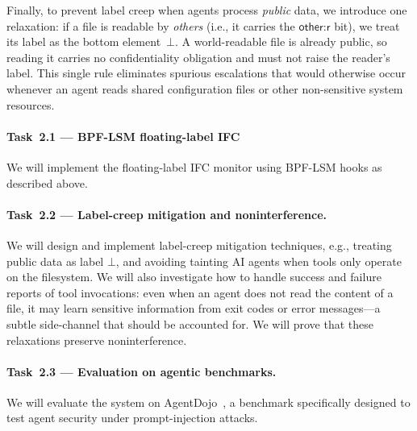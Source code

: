 \documentclass{kaw}
\begin{document}
Finally, to prevent label creep when agents process \emph{public} data, we
introduce one relaxation: if a file is readable by \emph{others} (i.e., it
carries the $\mathsf{other}\text{:}\mathsf{r}$ bit), we treat its label as the
bottom element~$\bot$.
A world-readable file is already public, so reading it carries no
confidentiality obligation and must not raise the reader's label.
This single rule eliminates spurious escalations that would otherwise occur
whenever an agent reads shared configuration files or other non-sensitive system
resources.
%
\paragraph{Task~2.1 --- BPF-LSM floating-label IFC}
We will implement the floating-label IFC monitor using BPF-LSM hooks 
as described above. 
%
\paragraph{Task~2.2 --- Label-creep mitigation and noninterference.}
We will design and implement label-creep mitigation techniques, e.g.,
treating public data as label $\bot$, and avoiding tainting AI agents when
tools only operate on the filesystem.
%
We will also investigate how to handle success and failure reports of tool
invocations: even when an agent does not read the content of a file, it may
learn sensitive information from exit codes or error messages---a subtle
side-channel that should be accounted for.
%
We will prove that these relaxations preserve noninterference.

\paragraph{Task~2.3 --- Evaluation on agentic benchmarks.}
We will evaluate the system on AgentDojo~\cite{Debenedetti:AgentDojo24}, a benchmark
specifically designed to test agent security under prompt-injection attacks. 
%
\end{document}
